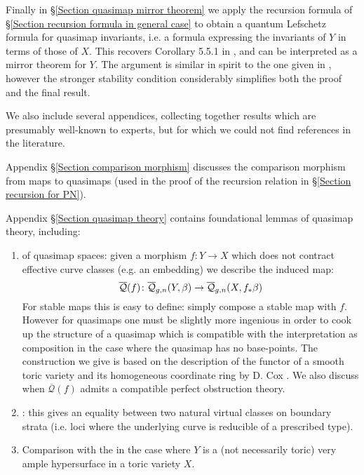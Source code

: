 Finally in \S \ref{Section quasimap mirror theorem} we apply the recursion formula of \S \ref{Section recursion formula in general case} to obtain a quantum Lefschetz formula for quasimap invariants, i.e. a formula expressing the invariants of $Y$ in terms of those of $X$. This recovers Corollary 5.5.1 in \cite{CF-K-wallcrossing}, and can be interpreted as a mirror theorem for $Y$. The argument is similar in spirit to the one given in \cite{Ga-MF}, however the stronger stability condition considerably simplifies both the proof and the final result.

We also include several appendices, collecting together results which are presumably well-known to experts, but for which we could not find references in the literature.

Appendix \S \ref{Section comparison morphism} discusses the comparison morphism from maps to quasimaps (used in the proof of the recursion relation in \S \ref{Section recursion for PN}).

Appendix \S \ref{Section quasimap theory} contains foundational lemmas of quasimap theory, including:
\begin{enumerate}
\item {} of quasimap spaces: given a morphism $f\colon Y\to X$ which does not contract effective curve classes (e.g. an embedding) we describe the induced map:
\begin{equation*} \overline{\mathcal{Q}}(f)\colon\overline{\mathcal Q}_{g,n}(Y,\beta)\rightarrow\overline{\mathcal Q}_{g,n}(X,f_*\beta) \end{equation*}
For stable maps this is easy to define: simply compose a stable map with $f$. However for quasimaps one must be slightly more ingenious in order to cook up the structure of a quasimap which is compatible with the interpretation as composition in the case where the quasimap has no base-points. The construction we give is based on the description of the functor of a smooth toric variety and its homogeneous coordinate ring by D. Cox \cite{CoxFunctor}\cite{CoxRing}. We also discuss when $\overline{\mathcal{Q}}(f)$ admits a compatible perfect obstruction theory.
\item {}: this gives an equality between two natural virtual classes on boundary strata (i.e. loci where the underlying curve is reducible of a prescribed type).
\item Comparison with the  \cite{CFKM} in the case where $Y$ is a (not necessarily toric) very ample hypersurface in a toric variety $X$.
\end{enumerate}

